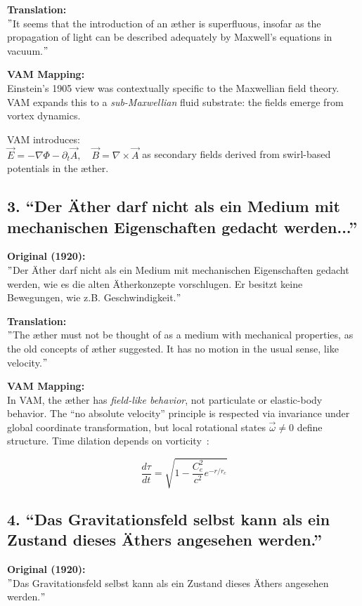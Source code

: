     \textbf{Translation:} \\
    \("\)It seems that the introduction of an æther is superfluous, insofar as the propagation of light can be described adequately by Maxwell's equations in vacuum.\("\)

    \textbf{VAM Mapping:} \\
    Einstein’s 1905 view was contextually specific to the Maxwellian field theory. VAM expands this to a \emph{sub-Maxwellian} fluid substrate: the fields emerge from vortex dynamics.

    VAM introduces: \\
    \( \vec{E} = -\nabla \Phi - \partial_t \vec{A}, \quad \vec{B} = \nabla \times \vec{A} \) as secondary fields derived from swirl-based potentials in the æther.

    \subsection*{3. “Der Äther darf nicht als ein Medium mit mechanischen Eigenschaften gedacht werden...”}
    \textbf{Original (1920):} \\
    \("\)Der Äther darf nicht als ein Medium mit mechanischen Eigenschaften gedacht werden, wie es die alten Ätherkonzepte vorschlugen. Er besitzt keine Bewegungen, wie z.B. Geschwindigkeit.\("\)

    \textbf{Translation:} \\
    \("\)The æther must not be thought of as a medium with mechanical properties, as the old concepts of æther suggested. It has no motion in the usual sense, like velocity.\("\)

    \textbf{VAM Mapping:} \\
    In VAM, the æther has \emph{field-like behavior}, not particulate or elastic-body behavior. The “no absolute velocity” principle is respected via invariance under global coordinate transformation, but local rotational states \( \vec{\omega} \neq 0 \) define structure. Time dilation depends on vorticity~\cite{iskandarani2024vam2}:

    \[
    \frac{d\tau}{dt} = \sqrt{1 - \frac{C_e^2}{c^2} e^{-r/r_c}}
    \]

    \subsection*{4. “Das Gravitationsfeld selbst kann als ein Zustand dieses Äthers angesehen werden.”}
    \textbf{Original (1920):} \\
    \("\)Das Gravitationsfeld selbst kann als ein Zustand dieses Äthers angesehen werden.\("\)

